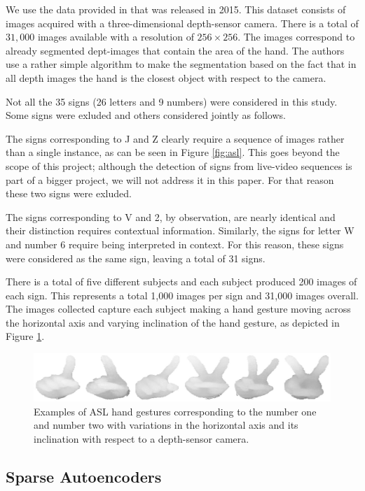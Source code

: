 We use the data provided in \cite{kang2015real} that was released in 2015. This
dataset consists of images acquired with a three-dimensional depth-sensor camera. 
There is a total of $31,000$ images available with a resolution of $256 \times
256$. The images correspond to already segmented dept-images that contain the
area of the hand. The authors use a rather simple algorithm to make the
segmentation based on the fact that in all depth images the hand is the closest
object with respect to the camera. 

Not all the 35 signs (26 letters and 9 numbers) 
were considered in this study. Some signs
were exluded and others considered jointly as follows.

The signs corresponding to J and Z clearly require a sequence of images rather
than a single instance, as can be seen in Figure \ref{fig:asl}. This goes
beyond the scope of this project; although the detection of signs from
live-video sequences is part of a bigger project, we will not address it in this
paper. For that reason these two signs were exluded.

The signs corresponding to V and 2, by observation, are nearly identical and
their distinction requires contextual information. Similarly, the signs for
letter W and number 6 require being interpreted in context. 
For this reason, these signs were considered as the same sign, leaving a total
of 31 signs.

There is a total of five different 
subjects and each subject produced 200 images of each
sign. This represents a total 1,000 images per sign and 31,000 images overall.
The images collected capture each subject making a hand gesture moving across
the horizontal axis and varying inclination of the hand gesture, as depicted in
Figure \ref{fig:sampN1}.

\begin{figure}
\centering
\includegraphics[width=\textwidth]{img/sampleNum1.eps}
\caption{Examples of ASL hand gestures corresponding to the number one and 
number two with variations in
the horizontal axis and its inclination with respect to a depth-sensor camera.}
\label{fig:sampN1}
\end{figure}


\subsection{Sparse Autoencoders}

